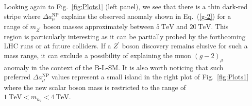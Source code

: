 \documentclass[10pt]{book}
\newcommand{\ro}[1]{\textrm{#1}}
\renewcommand{\(}{\left(}
\renewcommand{\)}{\right)}
\renewcommand{\[}{\left[}
\renewcommand{\]}{\right]}
\begin{document}
Looking again to Fig.~\ref{fig:Plots1} (left panel), we see that there is a thin dark-red stripe where $\Delta a^{\ro{NP}}_\mu$ explains the observed anomaly shown in Eq.~(\ref{g-2}) for a range of $m_{Z^\prime}$ boson masses approximately between $5~\ro{TeV}$ and $20~\ro{TeV}$. This region is particularly interesting as it can be partially probed by the forthcoming LHC runs or at future colliders. If a $Z^\prime$ boson discovery remains elusive for such a mass range, it can exclude a possibility of explaining the muon $\left(g-2\right)_\mu$ anomaly in the context of the B-L-SM. It is also worth noticing that such preferred $\Delta a^{\ro{NP}}_\mu$ values represent a small island in the right plot of Fig.~\ref{fig:Plots1} where the new scalar boson mass is restricted to the range of $1~\ro{TeV} < m_{h_2} < 4~\ro{TeV}$.
\end{document}
